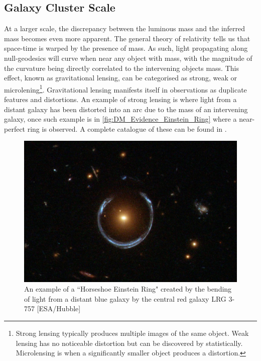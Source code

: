 \subsection{Galaxy Cluster Scale}
\par
At a larger scale, the discrepancy between the luminous mass and the inferred mass becomes even more apparent.
The general theory of relativity tells us that space-time is warped by the presence of mass.
As such, light propagating along null-geodesics will curve when near any object with mass, with the magnitude of the curvature being directly correlated to the intervening objects mass.
This effect, known as gravitational lensing, can be categorised as strong, weak or microlening\footnote{Strong lensing typically produces multiple images of the same object. Weak lensing has no noticeable distortion but can be discovered by statistically. Microlensing is when a significantly smaller object produces a distortion.}. 
Gravitational lensing manifests itself in observations as duplicate features and distortions.
An example of strong lensing is where light from a distant galaxy has been distorted into an arc due to the mass of an intervening galaxy, once such example is in \autoref{fig:DM_Evidence_Einstein_Ring}  where a near-perfect ring is observed.
A complete catalogue of these can be found in \cite{einstein_ring_discovery_ref}.

\begin{figure}%
    \centering
    \includegraphics[scale=0.4]{Figures/DarkMatterEvidence/Einstein_Ring_from_Hubble.JPG}
    \caption{An example of a ``Horseshoe Einstein Ring" created by the bending of light from a distant blue galaxy by the central red galaxy LRG 3-757 [ESA/Hubble]}
    \label{fig:DM_Evidence_Einstein_Ring}
\end{figure}

